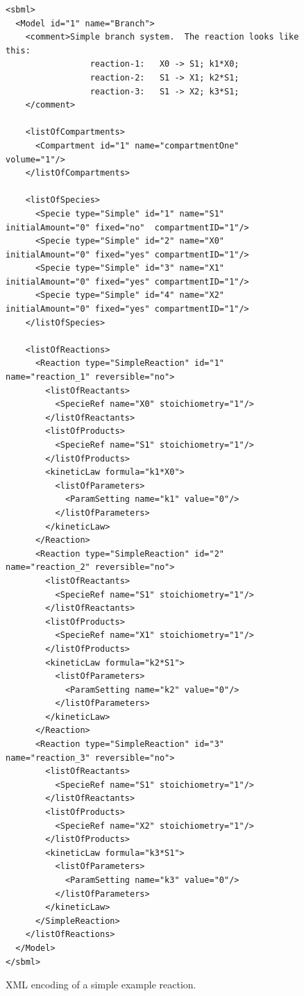 \documentclass[10pt]{article}
\newcommand{\tightspacing}{\renewcommand{\baselinestretch}{0.85}}
\begin{document}
\begin{figure}
  \small
  \tightspacing
\begin{verbatim}
<sbml>
  <Model id="1" name="Branch">
    <comment>Simple branch system.  The reaction looks like this:
                 reaction-1:   X0 -> S1; k1*X0;
                 reaction-2:   S1 -> X1; k2*S1;
                 reaction-3:   S1 -> X2; k3*S1;
    </comment>

    <listOfCompartments>
      <Compartment id="1" name="compartmentOne" volume="1"/>
    </listOfCompartments>

    <listOfSpecies>
      <Specie type="Simple" id="1" name="S1" initialAmount="0" fixed="no"  compartmentID="1"/>
      <Specie type="Simple" id="2" name="X0" initialAmount="0" fixed="yes" compartmentID="1"/>
      <Specie type="Simple" id="3" name="X1" initialAmount="0" fixed="yes" compartmentID="1"/>
      <Specie type="Simple" id="4" name="X2" initialAmount="0" fixed="yes" compartmentID="1"/>
    </listOfSpecies>

    <listOfReactions>
      <Reaction type="SimpleReaction" id="1" name="reaction_1" reversible="no">
        <listOfReactants>
          <SpecieRef name="X0" stoichiometry="1"/>
        </listOfReactants>
        <listOfProducts>
          <SpecieRef name="S1" stoichiometry="1"/>
        </listOfProducts>
        <kineticLaw formula="k1*X0">
          <listOfParameters>
            <ParamSetting name="k1" value="0"/>
          </listOfParameters>
        </kineticLaw>
      </Reaction>
      <Reaction type="SimpleReaction" id="2" name="reaction_2" reversible="no">
        <listOfReactants>
          <SpecieRef name="S1" stoichiometry="1"/>
        </listOfReactants>
        <listOfProducts>
          <SpecieRef name="X1" stoichiometry="1"/>
        </listOfProducts>
        <kineticLaw formula="k2*S1">
          <listOfParameters>
            <ParamSetting name="k2" value="0"/>
          </listOfParameters>
        </kineticLaw>
      </Reaction>
      <Reaction type="SimpleReaction" id="3" name="reaction_3" reversible="no">
        <listOfReactants>
          <SpecieRef name="S1" stoichiometry="1"/>
        </listOfReactants>
        <listOfProducts>
          <SpecieRef name="X2" stoichiometry="1"/>
        </listOfProducts>
        <kineticLaw formula="k3*S1">
          <listOfParameters>
            <ParamSetting name="k3" value="0"/>
          </listOfParameters>
        </kineticLaw>
      </SimpleReaction>
    </listOfReactions>
  </Model>
</sbml>
\end{verbatim}
  \tightspacing
  \caption{XML encoding of a simple example reaction.}
  \label{fig:simple-xml-example}
\end{figure}
\end{document}
